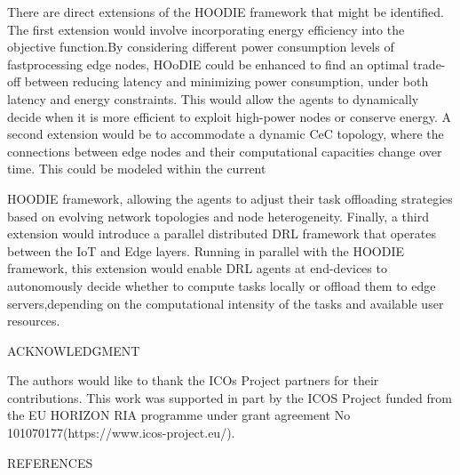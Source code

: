 \documentclass{article}
\begin{document}
There are direct extensions of the HOODIE framework that might be identified. The first extension would involve incorporating energy efficiency into the objective function.By considering different power consumption levels of fastprocessing edge nodes, HOoDIE could be enhanced to find an optimal trade-off between reducing latency and minimizing power consumption, under both latency and energy constraints. This would allow the agents to dynamically decide when it is more efficient to exploit high-power nodes or conserve energy. A second extension would be to accommodate a dynamic CeC topology, where the connections between edge nodes and their computational capacities change over time. This could be modeled within the current

HOODIE framework, allowing the agents to adjust their task offloading strategies based on evolving network topologies and node heterogeneity. Finally, a third extension would introduce a parallel distributed DRL framework that operates between the IoT and Edge layers. Running in parallel with the HOODIE framework, this extension would enable DRL agents at end-devices to autonomously decide whether to compute tasks locally or offload them to edge servers,depending on the computational intensity of the tasks and available user resources.

ACKNOWLEDGMENT

The authors would like to thank the ICOs Project partners for their contributions. This work was supported in part by the ICOS Project funded from the EU HORIZON RIA programme under grant agreement No 101070177(https://www.icos-project.eu/).

REFERENCES
\end{document}
